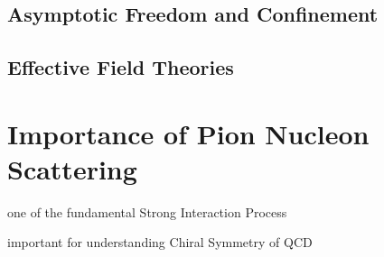 \subsection{Asymptotic Freedom and Confinement}

\subsection{Effective Field Theories}




\section{Importance of Pion Nucleon Scattering}

{\orange one of the fundamental Strong Interaction Process}

{\orange important for understanding Chiral Symmetry of QCD}

\newpage
